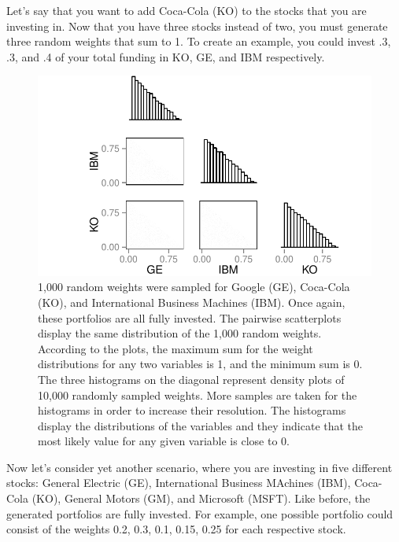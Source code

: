 \documentclass{article}\usepackage{graphicx, color}
\makeatletter
\def\maxwidth{ %
  \ifdim\Gin@nat@width>\linewidth
    \linewidth
  \else
    \Gin@nat@width
  \fi
}
\newenvironment{knitrout}{}{} %
\makeatother
\begin{document}
Let's say that you want to add Coca-Cola (KO) to the stocks that you are investing in. Now that you have three stocks instead of two, you must generate three random weights that sum to 1. To create an example, you could invest .3, .3, and .4 of your total funding in KO, GE, and IBM respectively. 
  
\begin{figure}[H]
\begin{knitrout}
\color{fgcolor}
\includegraphics[width=\maxwidth]{figure/figChunk1} 

\end{knitrout}

\caption{1,000 random weights were sampled for Google (GE), Coca-Cola (KO), and International Business Machines (IBM). Once again, these portfolios are all fully invested. The pairwise scatterplots display the same distribution of the 1,000 random weights. According to the plots, the maximum sum for the weight distributions for any two variables is 1, and the minimum sum is 0.
\\
The three histograms on the diagonal represent density plots of 10,000 randomly sampled weights. More samples are taken for the histograms in order to increase their resolution. The histograms display the distributions of the variables and they indicate that the most likely value for any given variable is close to 0.}

\end{figure}

Now let's consider yet another scenario, where you are investing in five different stocks: General Electric (GE), International Business MAchines (IBM), Coca-Cola (KO), General Motors (GM), and Microsoft (MSFT). Like before, the generated portfolios are fully invested. For example, one possible portfolio could consist of the weights 0.2, 0.3, 0.1, 0.15, 0.25 for each respective stock.
\end{document}
